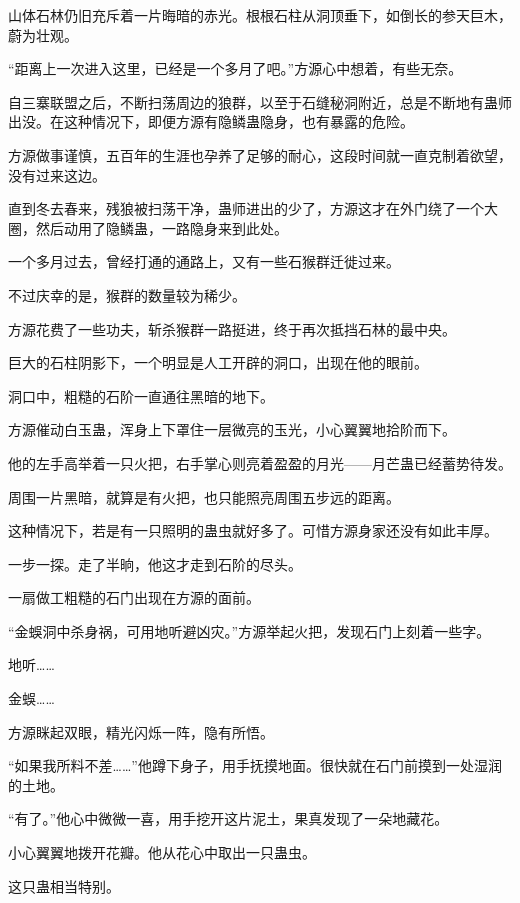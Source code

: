 
\begin{this_body}

山体石林仍旧充斥着一片晦暗的赤光。根根石柱从洞顶垂下，如倒长的参天巨木，蔚为壮观。

“距离上一次进入这里，已经是一个多月了吧。”方源心中想着，有些无奈。

自三寨联盟之后，不断扫荡周边的狼群，以至于石缝秘洞附近，总是不断地有蛊师出没。在这种情况下，即便方源有隐鳞蛊隐身，也有暴露的危险。

方源做事谨慎，五百年的生涯也孕养了足够的耐心，这段时间就一直克制着欲望，没有过来这边。

直到冬去春来，残狼被扫荡干净，蛊师进出的少了，方源这才在外门绕了一个大圈，然后动用了隐鳞蛊，一路隐身来到此处。

一个多月过去，曾经打通的通路上，又有一些石猴群迁徙过来。

不过庆幸的是，猴群的数量较为稀少。

方源花费了一些功夫，斩杀猴群一路挺进，终于再次抵挡石林的最中央。

巨大的石柱阴影下，一个明显是人工开辟的洞口，出现在他的眼前。

洞口中，粗糙的石阶一直通往黑暗的地下。

方源催动白玉蛊，浑身上下罩住一层微亮的玉光，小心翼翼地拾阶而下。

他的左手高举着一只火把，右手掌心则亮着盈盈的月光——月芒蛊已经蓄势待发。

周围一片黑暗，就算是有火把，也只能照亮周围五步远的距离。

这种情况下，若是有一只照明的蛊虫就好多了。可惜方源身家还没有如此丰厚。

一步一探。走了半晌，他这才走到石阶的尽头。

一扇做工粗糙的石门出现在方源的面前。

“金蜈洞中杀身祸，可用地听避凶灾。”方源举起火把，发现石门上刻着一些字。

地听……

金蜈……

方源眯起双眼，精光闪烁一阵，隐有所悟。

“如果我所料不差……”他蹲下身子，用手抚摸地面。很快就在石门前摸到一处湿润的土地。

“有了。”他心中微微一喜，用手挖开这片泥土，果真发现了一朵地藏花。

小心翼翼地拨开花瓣。他从花心中取出一只蛊虫。

这只蛊相当特别。


\end{this_body}
